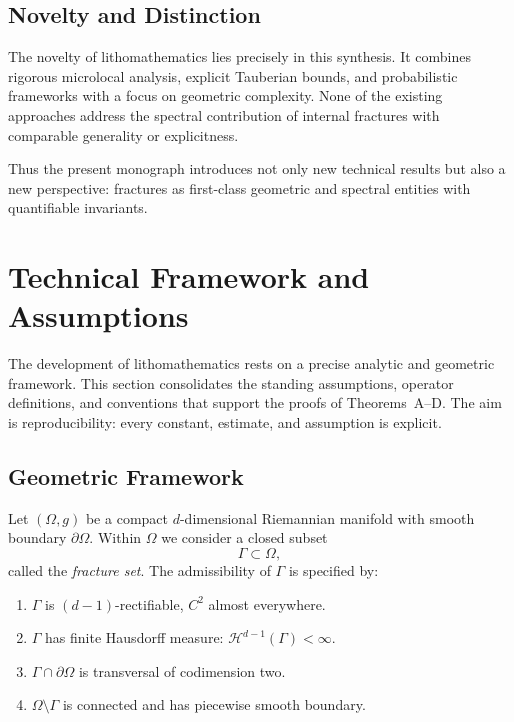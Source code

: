 \subsection{Novelty and Distinction}

The novelty of lithomathematics lies precisely in this synthesis. It combines 
rigorous microlocal analysis, explicit Tauberian bounds, and probabilistic 
frameworks with a focus on geometric complexity. None of the existing 
approaches address the spectral contribution of internal fractures with 
comparable generality or explicitness. 

Thus the present monograph introduces not only new technical results but also 
a new perspective: fractures as first-class geometric and spectral entities 
with quantifiable invariants.



\section{Technical Framework and Assumptions}

The development of lithomathematics rests on a precise analytic and geometric
framework. This section consolidates the standing assumptions, operator
definitions, and conventions that support the proofs of Theorems~A–D. The aim
is reproducibility: every constant, estimate, and assumption is explicit.

\subsection{Geometric Framework}

Let $(\Omega,g)$ be a compact $d$-dimensional Riemannian manifold with smooth
boundary $\partial\Omega$. Within $\Omega$ we consider a closed subset
\[
  \Gamma \subset \Omega,
\]
called the \emph{fracture set}. The admissibility of $\Gamma$ is specified by:

\begin{enumerate}[label=(G\arabic*)]
  \item $\Gamma$ is $(d-1)$-rectifiable, $C^2$ almost everywhere.
  \item $\Gamma$ has finite Hausdorff measure:
  $\mathcal{H}^{d-1}(\Gamma)<\infty$.
  \item $\Gamma \cap \partial\Omega$ is transversal of codimension two.
  \item $\Omega\setminus\Gamma$ is connected and has piecewise smooth boundary.
\end{enumerate}


